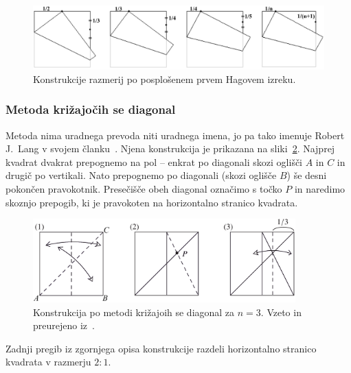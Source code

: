 \begin{figure}[h]
    \centering
    \includegraphics[width=\textwidth]{images/razdelitev_daljice_h1.png}
    \caption[Razdelitev na enake dele (prvi Hagov izrek)]{Konstrukcije razmerij po posplošenem prvem Hagovem izreku.}
    \label{fig:razdelitev_daljice_h1}
\end{figure}

\subsubsection*{Metoda križajočih se diagonal}

Metoda nima uradnega prevoda niti uradnega imena, jo pa tako imenuje Robert J.\ Lang v svojem članku~\cite{lang1988}. Njena konstrukcija je prikazana na sliki~\ref{fig:kriz_diag_3}. Najprej kvadrat dvakrat prepognemo na pol -- enkrat po diagonali skozi oglišči $A$ in $C$ in drugič po vertikali. Nato prepognemo po diagonali (skozi oglišče $B$) še desni pokončen pravokotnik. Presečišče obeh diagonal označimo s točko $P$ in naredimo skoznjo prepogib, ki je pravokoten na horizontalno stranico kvadrata.

\begin{figure}[h]
    \centering
    \includegraphics[width=0.9\textwidth]{images/tretjinjenje_stranice1.png}
    \caption[Razdelitev stranice na tri dele]{Konstrukcija po metodi križajoih se diagonal za $n=3$. Vzeto in preurejeno iz~\cite[str. 37]{hull2013}.}
    \label{fig:kriz_diag_3}
\end{figure}

\begin{trditev}[Metoda križajočih se diagonal za $n=3$]
    \label{trd:kriz_diag_3}
    Zadnji pregib iz zgornjega opisa konstrukcije razdeli horizontalno stranico kvadrata v razmerju $2:1$.
\end{trditev}

